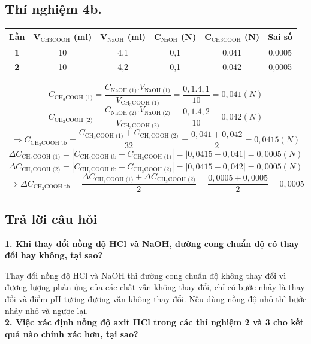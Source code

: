 \documentclass[12pt,a4paper]{report}
\begin{document}
\subsection*{Thí nghiệm 4b.}
\begin{table}[h!]
\centering
    \centering
    \begin{tabular}{|c|c|c|c|c|c|}
    \hline
    \textbf{Lần} & \textbf{V$_\text{CH3COOH}$ (ml)} & \textbf{V$_\text{NaOH}$ (ml)} & \textbf{C$_\text{NaOH}$ (N)} & \textbf{C$_\text{CH3COOH}$ (N)} & \textbf{Sai số} \\ \hline
    \textbf{1}   & 10                               & 4,1                           & 0,1                          & 0,041                           & 0,0005          \\ \hline
    \textbf{2}   & 10                               & 4,2                           & 0,1                          & 0.042                           & 0,0005          \\ \hline
    \end{tabular}
    \end{table}
    \[
        C_\text{CH$_3$COOH (1)} = \frac{C_\text{NaOH (1)}.V_\text{NaOH (1)}}{V_\text{CH$_3$COOH (1)}} = \frac{0,1.4,1}{10} = 0,041 (N)
    \]
    \[
        C_\text{CH$_3$COOH (2)} = \frac{C_\text{NaOH (2)}.V_\text{NaOH (2)}}{V_\text{CH$_3$COOH (2)}} = \frac{0,1.4,2}{10} = 0,042 (N)
    \]
    \[
        \Rightarrow C_\text{CH$_3$COOH tb} = \frac{C_\text{CH$_3$COOH (1)}+C_\text{CH$_3$COOH (2)}}{32} = \frac{0,041 + 0,042}{2} = 0,0415 (N)
    \]
    \[
        \Delta C_\text{CH$_3$COOH (1)} = |C_\text{CH$_3$COOH tb} - C_\text{CH$_3$COOH (1)}| = |0,0415 - 0,041| = 0,0005 (N)
    \]
    \[
        \Delta C_\text{CH$_3$COOH (2)} = |C_\text{CH$_3$COOH tb} - C_\text{CH$_3$COOH (2)}| = |0,0415 - 0,042| = 0,0005 (N)
    \]
    \[
        \Rightarrow \Delta C_\text{CH$_3$COOH tb} = \frac{\Delta C_\text{CH$_3$COOH (1)}+\Delta C_\text{CH$_3$COOH (2)}}{2} = \frac{0,0005 +0,0005}{2} = 0,0005
    \]
\subsection{Trả lời câu hỏi}
\noindent\textbf{1. Khi thay đổi nồng độ HCl và NaOH, đường cong chuẩn độ có thay đổi hay không, tại sao?}

Thay đổi nồng độ HCl và NaOH thì đường cong chuẩn độ không thay đổi vì đương lượng phản ứng của các chất vẫn không thay đổi, chỉ có bước nhảy là thay đổi và điểm pH tương đương vẫn không thay đổi. Nếu dùng nồng độ nhỏ thì bước nhảy nhỏ và ngược lại. \\
\textbf{2. Việc xác định nồng độ axit HCl trong các thí nghiệm 2 và 3 cho kết quả nào chính xác hơn, tại sao? }
\end{document}

